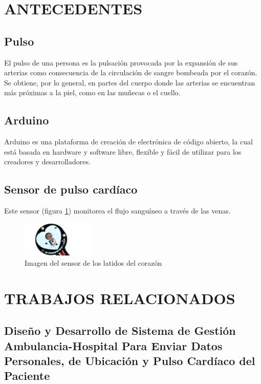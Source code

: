 \documentclass[letterpaper, 10 pt, conference]{ieeeconf}  %
\begin{document}
\section{ANTECEDENTES}

\subsection{Pulso}

El pulso de una persona es la pulsaci\'on provocada por la expansi\'on de sus arterias como consecuencia de la circulaci\'on de sangre bombeada por el coraz\'on. Se obtiene, por lo general, en partes del cuerpo donde las arterias se encuentran m\'as pr\'oximas a la piel, como en las muñecas o el cuello.

\subsection{Arduino}

Arduino es una plataforma de creaci\'on de electr\'onica de c\'odigo abierto, la cual est\'a basada en hardware y software libre, flexible y f\'acil de utilizar para los creadores y desarrolladores. 

\subsection{Sensor de pulso card\'iaco}

Este sensor (figura \ref{fig:sensor3}) monitorea el flujo sangu\'ineo a trav\'es de las venas.

\begin{figure}
\centering
\includegraphics[width=0.30\textwidth]{pulse.png}
\caption{Imagen del sensor de los latidos del coraz\'on \cite{c1}}
\label{fig:sensor3}
\end{figure}

\section{TRABAJOS RELACIONADOS}


\subsection{Dise\~{n}o y Desarrollo de Sistema de Gesti\'on Ambulancia-Hospital Para Enviar Datos Personales, de Ubicaci\'on y Pulso Card\'iaco del Paciente \cite{c9}}
\end{document}
